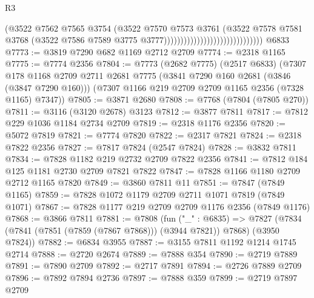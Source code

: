 \begin{lexlean}{R3}
\begin{coremodule}
                                                        (@3522
                                                          @7562
                                                          @7565
                                                          @3754
                                                          (@3522
                                                            @7570
                                                            @7573
                                                            @3761
                                                            (@3522
                                                              @7578
                                                              @7581
                                                              @3768
                                                              (@3522
                                                                @7586
                                                                @7589
                                                                @3775
                                                                @3777))))))))))))))))))))))))))))))
    @6833
@7773 := @3819 @7290 @682 @1169 @2712 @2709
@7774 := @2318 @1165
@7775 := @7774 @2356
@7804 := @7773
    (@2682 @7775)
    (@2517 @6833)
    (@7307
      @178
      @1168
      @2709
      @2711
      @2681
      @7775
      (@3841 @7290 @160 @2681 (@3846 (@3847 @7290 @160)))
      (@7307 @1166 @219 @2709 @2709 @1165 @2356 (@7328 @1165) @7347))
@7805 := @3871 @2680
@7808 := @7768 (@7804 (@7805 @270))
@7811 := @3116 (@3120 @2678) @3123
@7812 := @3877 @7811
@7817 := @7812 @229 @1036 @1184 @2734 @2709
@7819 := @2318 @1176 @2356
@7820 := @5072 @7819
@7821 := @7774 @7820
@7822 := @2317 @7821
@7824 := @2318 @7822 @2356
@7827 := @7817 @7824 (@2547 @7824)
@7828 := @3832 @7811
@7834 := @7828 @1182 @219 @2732 @2709 @7822 @2356
@7841 := @7812 @184 @125 @1181 @2730 @2709 @7821 @7822
@7847 := @7828 @1166 @1180 @2709 @2712 @1165 @7820
@7849 := @3860 @7811 @11
@7851 := @7847 (@7849 @1165)
@7859 := @7828 @1072 @1179 @2709 @2711 @1071 @7819 (@7849 @1071)
@7867 := @7828 @1177 @219 @2709 @2709 @1176 @2356 (@7849 @1176)
@7868 := @3866 @7811
@7881 := @7808
    (fun ("_" : @6835) =>
    @7827 (@7834 (@7841 (@7851 (@7859 (@7867 @7868))) (@3944 @7821)) @7868) (@3950 @7824))
@7882 := @6834 @3955
@7887 := @3155 @7811 @1192 @1214 @1745 @2714
@7888 := @2720 @2674
@7889 := @7888 @354
@7890 := @2719 @7889
@7891 := @7890 @2709
@7892 := @2717 @7891
@7894 := @2726 @7889 @2709
@7896 := @7892 @7894 @2736
@7897 := @7888 @359
@7899 := @2719 @7897 @2709

\end{coremodule}
\end{lexlean}
